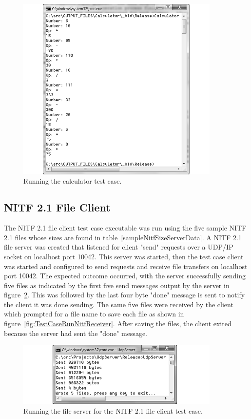 \begin{figure}[h!]
\centering
\includegraphics[width=0.9\textwidth]{figures/TestCaseRunCalculator.png}
\caption{Running the calculator test case.}
\label{fig:TestCaseRunCalculator}
\end{figure}

\subsection{NITF 2.1 File Client}
\label{subsections:GeneratedFileClient}
The NITF 2.1 file client test case executable was run using the five sample NITF 2.1 files whose sizes are found in table~\ref{sampleNitfSizeServerData}.  A NITF 2.1 file server was created that listened for client "send" requests over a UDP/IP socket on localhost port 10042.  This server was started, then the test case client was started and configured to send requests and receive file transfers on localhost port 10042.  The expected outcome occurred, with the server successfully sending five files as indicated by the first five send messages output by the server in figure~\ref{fig:TestCaseRunNitfServer}.  This was followed by the last four byte "done" message is sent to notify the client it was done sending.  The same five files were received by the client which prompted for a file name to save each file as shown in  figure~\ref{fig:TestCaseRunNitfReceiver}.  After saving the files, the client exited because the server had sent the "done" message.

\begin{figure}[h!]
\centering
\includegraphics[width=0.9\textwidth]{figures/TestCaseRunNitfServer.png}
\caption{Running the file server for the NITF 2.1 file client test case.}
\label{fig:TestCaseRunNitfServer}
\end{figure}

